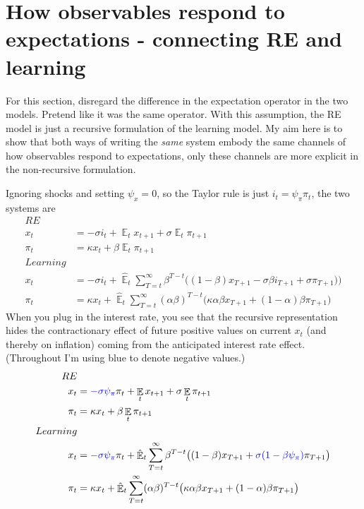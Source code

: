 \documentclass[11pt]{article}
\renewcommand{\[}{\begin{equation}}
\renewcommand{\]}{\end{equation}}
\DeclareMathOperator{\E}{\mathbb{E}}
\begin{document}
\newpage
\section{How observables respond to expectations - connecting RE and learning}

For this section, disregard the difference in the expectation operator in the two models. Pretend like it was the same operator. With this assumption, the RE model is just a recursive formulation of the learning model. My aim here is to show that both ways of writing the \emph{same} system embody the same channels of how observables respond to expectations, only these channels are more explicit in the non-recursive formulation.

Ignoring shocks and setting $\psi_x = 0$, so the Taylor rule is just $i_t =  \psi_{\pi}\pi_t$, the two systems are
\begin{align*}
RE& \\
x_t &= - \sigma i_t + \E_t x_{t+1}   + \sigma \E_t \pi_{t+1}  \\
\pi_t &= \kappa x_t +\beta \E_t \pi_{t+1} \\
Learning & \\
x_t &=  -\sigma i_t +\hat{\E}_t \sum_{T=t}^{\infty} \beta^{T-t }\big( (1-\beta)x_{T+1} - \sigma\beta i_{T+1} +\sigma \pi_{T+1}) \big)  \\
\pi_t &= \kappa x_t +\hat{\E}_t \sum_{T=t}^{\infty} (\alpha\beta)^{T-t }\big( \kappa \alpha \beta x_{T+1} + (1-\alpha)\beta \pi_{T+1} \big)
\end{align*}
When you plug in the interest rate, you see that the recursive representation hides the contractionary effect of future positive values on current $x_t$ (and thereby on inflation) coming from the anticipated interest rate effect. (Throughout I'm using blue to denote negative values.)
\begin{align*}
RE& \\
x_t &= \textcolor{blue}{- \sigma \psi_{\pi}} \pi_t+  \E_t x_{t+1}   + \sigma \E_t \pi_{t+1}  \\
\pi_t &= \kappa x_t +\beta \E_t \pi_{t+1} \\
Learning & \\
x_t &= \textcolor{blue}{ -\sigma \psi_{\pi}} \pi_t +\hat{\E}_t \sum_{T=t}^{\infty} \beta^{T-t }\big( (1-\beta) x_{T+1} + \textcolor{blue}{\sigma(1- \beta \psi_{\pi})}\pi_{T+1} \big)  \\
\pi_t &= \kappa x_t +\hat{\E}_t \sum_{T=t}^{\infty} (\alpha\beta)^{T-t }\big( \kappa \alpha \beta x_{T+1} + (1-\alpha)\beta \pi_{T+1} \big)
\end{align*}
\end{document}
